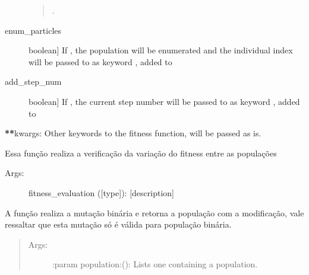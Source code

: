 \documentclass[letterpaper,10pt,english]{sphinxmanual}
\begin{document}
\begin{fulllineitems}
\begin{fulllineitems}
\begin{description}
\begin{quote}
.
\end{quote}

\item[{enum\_particles}] \leavevmode{[}boolean{]}
If , the population will be enumerated and the individual index will
be passed to  as keyword , added to 

\item[{add\_step\_num}] \leavevmode{[}boolean{]}
If , the current step number will be passed to 
as keyword , added to 

\end{description}

{\color{red}\bfseries{}**}kwargs: Other keywords to the fitness function, will be passed as is.

\end{fulllineitems}


\begin{fulllineitems}
\label{\detokenize{index:ga.Genetic.fitness_variation}}
Essa função realiza a verificação da variação do fitness entre as populações
\begin{description}
\item[{Args:}] \leavevmode
fitness\_evaluation ({[}type{]}): {[}description{]}

\end{description}

\end{fulllineitems}


\begin{fulllineitems}
\label{\detokenize{index:ga.Genetic.mutation_binary}}
A função realiza a mutação binária e retorna a população com a modificação,
vale ressaltar que esta mutação só é válida para população binária.
\begin{quote}
\begin{description}
\item[{Args:}] \leavevmode
:param population:(): Lists one containing a population.


\end{description}
\end{quote}
\end{fulllineitems}
\end{fulllineitems}
\end{document}
